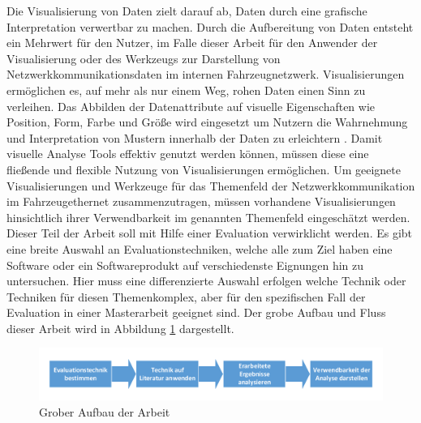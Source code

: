 \documentclass[draft=false
              ,paper=a4
              ,twoside=false
              ,fontsize=11pt
              ,headsepline
              ,BCOR10mm
              ,DIV11
              ]{scrbook}
\newcommand{\TODO}[1]{\colorbox{yellow}{\textcolor{red}{[TODO: #1]}}}
\begin{document}
Die Visualisierung von Daten zielt darauf ab, Daten durch eine grafische Interpretation verwertbar zu machen. Durch die Aufbereitung von Daten entsteht ein Mehrwert für den Nutzer, im Falle dieser Arbeit für den Anwender der Visualisierung oder des Werkzeugs zur Darstellung von Netzwerkkommunikationsdaten im internen Fahrzeugnetzwerk. Visualisierungen ermöglichen es, auf mehr als nur einem Weg, rohen Daten einen Sinn zu verleihen. Das Abbilden der Datenattribute auf visuelle Eigenschaften wie Position, Form, Farbe und Größe wird eingesetzt um Nutzern die Wahrnehmung und Interpretation von Mustern innerhalb der Daten zu erleichtern \cite{shneiderman_designing_2005}. Damit visuelle Analyse Tools effektiv genutzt werden können, müssen diese eine fließende und flexible Nutzung von Visualisierungen ermöglichen. 
%
Um geeignete Visualisierungen und Werkzeuge für das Themenfeld der Netzwerkkommunikation im Fahrzeugethernet zusammenzutragen, müssen vorhandene Visualisierungen hinsichtlich ihrer Verwendbarkeit im genannten Themenfeld eingeschätzt werden. Dieser Teil der Arbeit soll mit Hilfe einer Evaluation verwirklicht werden. Es gibt eine breite Auswahl an Evaluationstechniken, welche alle zum Ziel haben eine Software oder ein Softwareprodukt auf verschiedenste Eignungen hin zu untersuchen. Hier muss eine differenzierte Auswahl erfolgen welche Technik oder Techniken für diesen Themenkomplex, aber für den spezifischen Fall der Evaluation in einer Masterarbeit geeignet sind. Der grobe Aufbau und Fluss dieser Arbeit wird in Abbildung \ref{fig:aufbaugrob} dargestellt. 

\begin{figure}[htbp]
  \centering
  \includegraphics[width=\textwidth]{img/Aufbau_grob.pdf}
  \caption{Grober Aufbau der Arbeit}
  \label{fig:aufbaugrob}
\end{figure}
\end{document}
